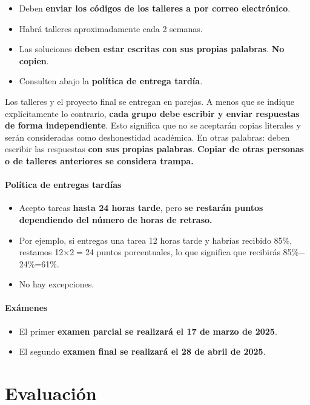 \documentclass[10pt]{article}
\begin{document}
	\begin{itemize}
		\item Deben \textbf{enviar los códigos de los talleres a por correo electrónico}.
		\item Habrá talleres aproximadamente cada 2 semanas.
		\item Las soluciones \textbf{deben estar escritas con sus propias palabras}. \textbf{No copien}.
		\item Consulten abajo la \textbf{política de entrega tardía}.
	\end{itemize}
	Los talleres y el proyecto final se entregan en parejas. A menos que se indique explícitamente lo contrario, \textbf{cada grupo debe escribir y enviar respuestas de forma independiente}. Esto significa que no se aceptarán copias literales y serán consideradas como deshonestidad académica. En otras palabras: deben escribir las respuestas \textbf{con sus propias palabras}. \textbf{Copiar de otras personas o de talleres anteriores se considera trampa.}
	
	\paragraph{Política de entregas tardías}
	\begin{itemize}
		\item Acepto tareas \textbf{hasta 24 horas tarde}, pero \textbf{se restarán puntos dependiendo del número de horas de retraso.}
		\item Por ejemplo, si entregas una tarea 12 horas tarde y habrías recibido 85\%, restamos 12$\times$2$=$24 puntos porcentuales, lo que significa que recibirás 85\%$-$24\%=61\%.
		\item No hay excepciones.
	\end{itemize}
	
	\paragraph{Exámenes}
	\begin{itemize}
		\item El primer \textbf{examen parcial se realizará el 17 de marzo de 2025}.
		\item El segundo \textbf{examen final se realizará el 28 de abril de 2025}.
	\end{itemize}
	
	\section*{Evaluación}
	
\end{document}
